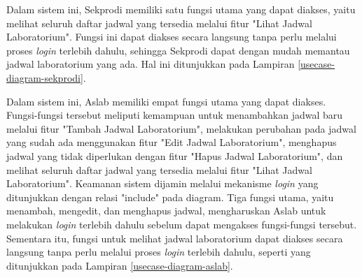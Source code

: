 Dalam sistem ini, Sekprodi memiliki satu fungsi utama yang dapat diakses, yaitu melihat seluruh daftar jadwal yang tersedia melalui fitur "Lihat Jadwal Laboratorium". Fungsi ini dapat diakses secara langsung tanpa perlu melalui proses \textit{login} terlebih dahulu, sehingga Sekprodi dapat dengan mudah memantau jadwal laboratorium yang ada. Hal ini ditunjukkan pada Lampiran \ref{usecase-diagram-sekprodi}.

Dalam sistem ini, Aslab memiliki empat fungsi utama yang dapat diakses. Fungsi-fungsi tersebut meliputi kemampuan untuk menambahkan jadwal baru melalui fitur "Tambah Jadwal Laboratorium", melakukan perubahan pada jadwal yang sudah ada menggunakan fitur "Edit Jadwal Laboratorium", menghapus jadwal yang tidak diperlukan dengan fitur "Hapus Jadwal Laboratorium", dan melihat seluruh daftar jadwal yang tersedia melalui fitur "Lihat Jadwal Laboratorium". Keamanan sistem dijamin melalui mekanisme \textit{login} yang ditunjukkan dengan relasi "include" pada diagram. Tiga fungsi utama, yaitu menambah, mengedit, dan menghapus jadwal, mengharuskan Aslab untuk melakukan \textit{login} terlebih dahulu sebelum dapat mengakses fungsi-fungsi tersebut. Sementara itu, fungsi untuk melihat jadwal laboratorium dapat diakses secara langsung tanpa perlu melalui proses \textit{login} terlebih dahulu, seperti yang ditunjukkan pada Lampiran \ref{usecase-diagram-aslab}.



